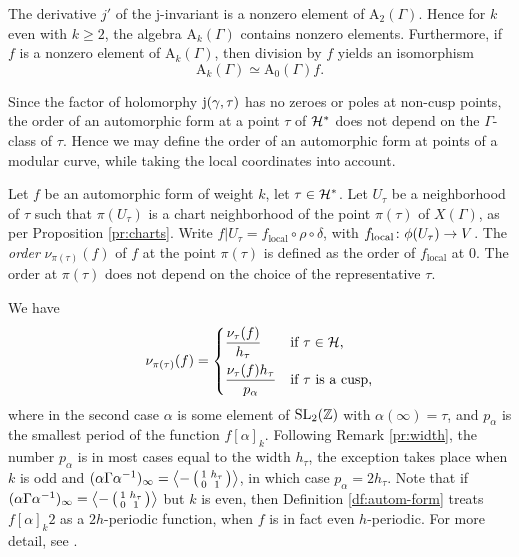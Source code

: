 \begin{rmk} \label{pr:nonzero-elt}
 The derivative $j'$ of the j-invariant is a nonzero element of $\mathrm{A}_2(\Gamma)$. Hence for $k$ even with $k\geq 2$, the algebra $\mathrm{A}_k(\Gamma)$ contains nonzero elements. Furthermore, if $f$ is a nonzero element of $\mathrm{A}_k(\Gamma)$, then division by $f$ yields an isomorphism \[\mathrm{A}_k(\Gamma)\simeq\mathrm{A}_0(\Gamma)f.\]
\end{rmk}

Since the factor of holomorphy $\mathrm{j}(\gamma,\tau)$ has no zeroes or poles at non-cusp points, the order of an automorphic form at a point $\tau$ of $\mathcal{H^*}$ does not depend on the $\Gamma$-class of $\tau$. Hence we may define the order of an automorphic form at points of a modular curve, while taking the local coordinates into account.

\begin{defi}
 Let $f$ be an automorphic form of weight $k$, let $\tau\in\mathcal{H}^*$. Let $U_\tau$ be a neighborhood of $\tau$ such that $\pi(U_\tau)$ is a chart neighborhood of the point $\pi(\tau)$ of $X(\Gamma)$, as per Proposition \ref{pr:charts}. Write $f|{U_\tau}=f_{\text{local}}\circ\rho\circ\delta$, with $f_{\text{local}}\colon\phi(U_\tau)\to V$. The \emph{order} $\nu_{\pi(\tau)}(f)$ of $f$ at the point $\pi(\tau)$ is defined as the order of $f_{\text{local}}$ at $0$. The order at $\pi(\tau)$ does not depend on the choice of the representative $\tau$.
\end{defi}

\begin{rmk}
 We have
 \[\nu_{\pi(\tau)}(f)=\begin{dcases*}\frac{\nu_{\tau}(f)}{h_\tau} & if $\tau\in\mc{H}$, \\
                                  \frac{\nu_{\tau}(f)h_\tau}{p_\alpha} & if $\tau$ is a cusp,\end{dcases*}\]
 where in the second case $\alpha$ is some element of $\operatorname{SL}_2(\mathbb{Z})$ with $\alpha(\infty)=\tau$, and $p_\alpha$ is the smallest period of the function $f[\alpha]_k$. Following Remark \ref{pr:width}, the number $p_\alpha$ is in most cases equal to the width $h_\tau$, the exception takes place when $k$ is odd and $(\alpha\Gamma\alpha^{-1})_\infty=\left\langle -\left(\begin{smallmatrix}1&h_\tau \\ 0&1\end{smallmatrix}\right) \right\rangle$, in which case $p_\alpha=2h_\tau$. Note that if $(\alpha\Gamma\alpha^{-1})_\infty=\left\langle -\left(\begin{smallmatrix}1&h_\tau \\ 0&1\end{smallmatrix}\right) \right\rangle$ but $k$ is even, then Definition \ref{df:autom-form} treats $f[\alpha]_k2$ as a $2h$-periodic function, when $f$ is in fact even $h$-periodic. For more detail, see \cite[p.\ 74-75]{Diamond-Shurman}.
\end{rmk}

